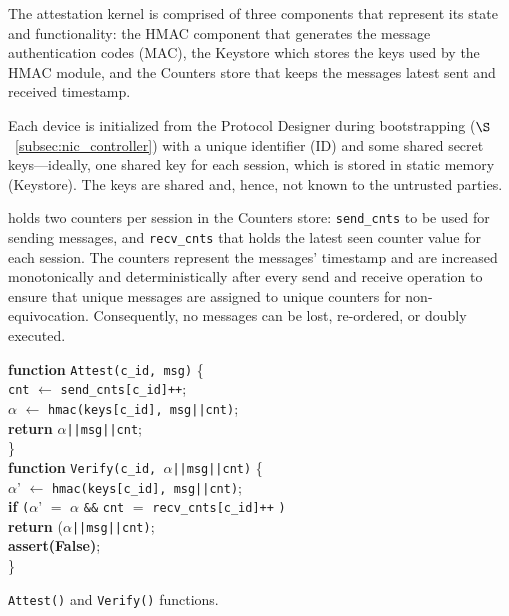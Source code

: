 The attestation kernel is comprised of three components that represent its state and functionality: the HMAC component that generates the message authentication codes (MAC), the Keystore which stores the keys used by the HMAC module, and the Counters store that keeps the messages latest sent and received timestamp. 

Each \projecttitle{} device is initialized from the Protocol Designer during bootstrapping ($\S$~\ref{subsec:nic_controller}) with a unique identifier (ID) and some shared secret keys---ideally, one shared key for each session, which is stored in static memory (Keystore). The keys are shared and, hence, not known to the untrusted parties. 



\projecttitle{} holds two counters per session in the Counters store: {\tt send\_cnts} to be used for sending messages, and \texttt{recv\_cnts} that holds the latest seen counter value for each session. The counters represent the messages' timestamp and are increased monotonically and deterministically after every send and receive operation to ensure that unique messages are assigned to unique counters for non-equivocation. Consequently, no messages can be lost, re-ordered, or doubly executed.



\begin{algorithm}[t]
\SetAlgoLined
\small
\textbf{function} \texttt{Attest(c\_id, msg)} \{ \\
\Indp
{\tt cnt} $\leftarrow$ {\tt send\_cnts[c\_id]++};\\
$\alpha$ $\leftarrow$ {\tt hmac(keys[c\_id], msg||cnt)}; \\
\textbf{return} $\alpha${\tt ||msg||cnt};\\
\Indm
\} \\


\textbf{function} \texttt{Verify(c\_id, $\alpha$||msg||cnt)} \{ \\
\Indp
    $\alpha$' $\leftarrow$ {\tt hmac(keys[c\_id], msg||cnt)};\\
    \textbf{if} {\tt (}$\alpha$' $=$ $\alpha$ {\tt \&\&} {\tt cnt} $=$ {\tt recv\_cnts[c\_id]++} {\tt )}\\
    \Indp
        \textbf{return} ($\alpha${\tt ||msg||cnt)}; \\
    \Indm
    \textbf{assert(False)}; \\
\Indm
\} \\
\vspace{-1pt}
\caption{\texttt{Attest()} and \texttt{Verify()} functions.}
\label{algo:primitives}
\end{algorithm}



